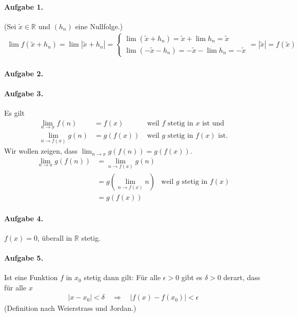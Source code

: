 \documentclass{article}
\begin{document}
\paragraph{Aufgabe 1.} (Sei $\tilde{x} \in \mathbb{R}$ und $(h_n)$ eine Nullfolge.)
\begin{align*}
    \lim f(\tilde{x} + h_n) = \lim |\tilde{x} + h_n| = \begin{cases}
        \lim (\tilde{x} + h_n) = \tilde{x} + \lim h_n = \tilde{x} \\
        \lim (-\tilde{x} - h_n) = -\tilde{x} - \lim h_n = -\tilde{x}
    \end{cases} = |\tilde{x}| = f(\tilde{x})
\end{align*}

\paragraph{Aufgabe 2.}

\paragraph{Aufgabe 3.}
Es gilt
\begin{align*}
    \lim_{n \to x} f(n) &= f(x)\ &\text{weil $f$ stetig in $x$ ist und} \\
    \lim_{n \to f(x)} g(n) &= g(f(x))\ &\text{weil $g$ stetig in $f(x)$ ist.}
\end{align*}
Wir wollen zeigen, dass $\lim_{n \to x} g(f(n)) = g(f(x))$.
\begin{align*}
    \lim_{n \to x} g(f(n)) &= \lim_{n \to f(x)} g(n) \\
    &= g\left(\lim_{n \to f(x)} n\right) & \text{weil $g$ stetig in $f(x)$}\\
    &= g\left(f(x)\right)
\end{align*}

\paragraph{Aufgabe 4.} $f(x) = 0$, überall in $\mathbb{R}$ stetig.

\paragraph{Aufgabe 5.}

Ist eine Funktion $f$ in $x_0$ stetig dann gilt: Für alle $\epsilon > 0$ gibt es $\delta > 0$ derart, dass für alle $x$
\begin{align*}
    |x - x_0| < \delta \quad\Longrightarrow\quad |f(x) - f(x_0)| < \epsilon
\end{align*}
(Definition nach Weierstrass und Jordan.)
\end{document}
